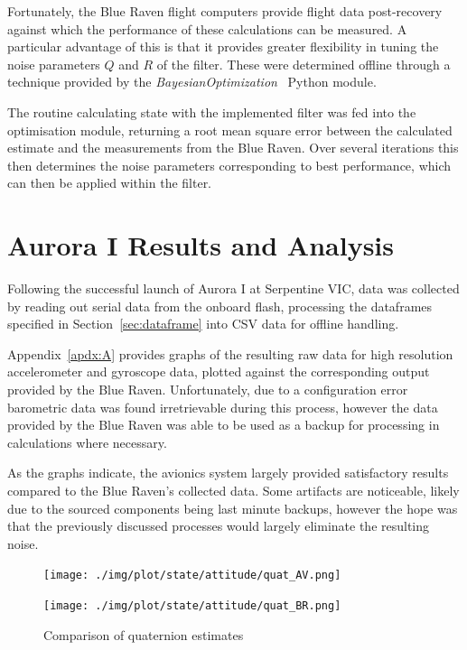 Fortunately, the Blue Raven flight computers provide flight data post-recovery against which the performance of these calculations can be measured. A particular advantage of this is that it provides greater flexibility in tuning the noise parameters $Q$ and $R$ of the filter. These were determined offline through a technique provided by the \textit{BayesianOptimization}~\cite{Bayesian2014} Python module. 

The routine calculating state with the implemented filter was fed into the optimisation module, returning a root mean square error between the calculated estimate and the measurements from the Blue Raven. Over several iterations this then determines the noise parameters corresponding to best performance, which can then be applied within the filter.

\section{Aurora I Results and Analysis}
Following the successful launch of Aurora I at Serpentine VIC, data was collected by reading out serial data from the onboard flash, processing the dataframes specified in Section~\ref{sec:dataframe} into CSV data for offline handling. 

Appendix~\ref{apdx:A} provides graphs of the resulting raw data for high resolution accelerometer and gyroscope data, plotted against the corresponding output provided by the Blue Raven. Unfortunately, due to a configuration error barometric data was found irretrievable during this process, however the data provided by the Blue Raven was able to be used as a backup for processing in calculations where necessary.

As the graphs indicate, the avionics system largely provided satisfactory results compared to the Blue Raven's collected data. Some artifacts are noticeable, likely due to the sourced components being last minute backups, however the hope was that the previously discussed processes would largely eliminate the resulting noise. 

\begin{figure}[ht!]
  \begin{minipage}{0.5\textwidth}
    \texttt{[image: ./img/plot/state/attitude/quat\_AV.png]}
  \end{minipage}
  \begin{minipage}{0.5\textwidth}
    \texttt{[image: ./img/plot/state/attitude/quat\_BR.png]}
  \end{minipage}
\caption{Comparison of quaternion estimates}\label{fig:quat-estimates}
\end{figure}

